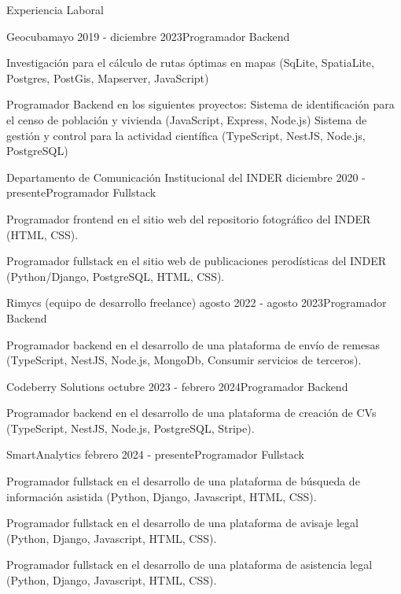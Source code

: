 \documentclass{resume}
\begin{document}
	
	\begin{rSection}{Experiencia Laboral}
		\begin{rSubsection}{Geocuba}{mayo 2019 - diciembre 2023}{Programador Backend}{}
			\item Investigación para el cálculo de rutas óptimas en mapas
				\subitem (SqLite, SpatiaLite, Postgres, PostGis, Mapserver, JavaScript)
			\item Programador Backend en los siguientes proyectos: 
				\subitem Sistema de identificación para el censo de población y vivienda 
					\subsubitem (JavaScript, Express, Node.js)
				\subitem Sistema de gestión y control para la actividad científica
					\subsubitem(TypeScript, NestJS, Node.js, PostgreSQL)
		\end{rSubsection}
	
		\begin{rSubsection}{Departamento de Comunicación Institucional del INDER}{ diciembre 2020 - presente}{Programador Fullstack}{}
			\item Programador frontend en el sitio web del repositorio fotográfico del INDER 
				\subitem(HTML, CSS).
			\newline
			\item Programador fullstack en el sitio web de publicaciones perodísticas del INDER 
				\subitem(Python/Django, PostgreSQL, HTML, CSS).
			
		\end{rSubsection}
		
		\begin{rSubsection}{Rimycs (equipo de desarrollo freelance)}{ agosto 2022 - agosto 2023}{Programador Backend}{}
			\item Programador backend en el desarrollo de una plataforma de envío de remesas 
			\subitem(TypeScript, NestJS, Node.js, MongoDb, Consumir servicios de terceros).
			
		\end{rSubsection}	
	
		\begin{rSubsection}{Codeberry Solutions}{ octubre 2023 - febrero 2024}{Programador Backend}{}
			\item Programador backend en el desarrollo de una plataforma de creación de CVs 
			\subitem(TypeScript, NestJS, Node.js, PostgreSQL, Stripe).
			
		\end{rSubsection}	
		
		\begin{rSubsection}{SmartAnalytics}{ febrero 2024 - presente}{Programador Fullstack}{}
			\item Programador fullstack en el desarrollo de una plataforma de búsqueda de información asistida
				\subitem(Python, Django, Javascript, HTML, CSS).
			\item Programador fullstack en el desarrollo de una plataforma de avisaje legal
				\subitem(Python, Django, Javascript, HTML, CSS).
			\item Programador fullstack en el desarrollo de una plataforma de asistencia legal
				\subitem(Python, Django, Javascript, HTML, CSS).
			

\end{rSubsection}
\end{rSection}
\end{document}

